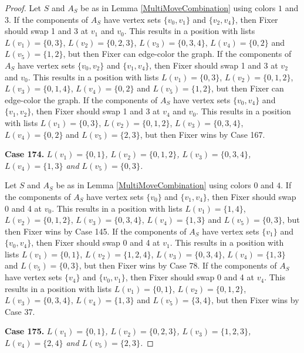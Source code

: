 \documentclass[12pt]{amsart}
\theoremstyle{plain}
\theoremstyle{definition}
\theoremstyle{remark}
\begin{document}
\begin{proof}
Let $S$ and $A_S$ be as in Lemma \ref{MultiMoveCombination} using colors $1$ and $3$. If the components of $A_S$ have vertex sets $\{v_0, v_1\}$ and $\{v_2, v_4\}$, then Fixer should swap 1 and 3 at $v_1$ and $v_0$. This results in a position with lists $L(v_1) = \{0, 3\}$, $L(v_2) = \{0, 2, 3\}$, $L(v_3) = \{0, 3, 4\}$, $L(v_4) = \{0, 2\}$ and $L(v_5) = \{1, 2\}$, but then Fixer can edge-color the graph.
If the components of $A_S$ have vertex sets $\{v_0, v_2\}$ and $\{v_1, v_4\}$, then Fixer should swap 1 and 3 at $v_2$ and $v_0$. This results in a position with lists $L(v_1) = \{0, 3\}$, $L(v_2) = \{0, 1, 2\}$, $L(v_3) = \{0, 1, 4\}$, $L(v_4) = \{0, 2\}$ and $L(v_5) = \{1, 2\}$, but then Fixer can edge-color the graph.
If the components of $A_S$ have vertex sets $\{v_0, v_4\}$ and $\{v_1, v_2\}$, then Fixer should swap 1 and 3 at $v_4$ and $v_0$. This results in a position with lists $L(v_1) = \{0, 3\}$, $L(v_2) = \{0, 1, 2\}$, $L(v_3) = \{0, 3, 4\}$, $L(v_4) = \{0, 2\}$ and $L(v_5) = \{2, 3\}$, but then Fixer wins by Case 167.

\noindent\textbf{Case 174.  }\textit{$L(v_1) = \{0, 1\}$, $L(v_2) = \{0, 1, 2\}$, $L(v_3) = \{0, 3, 4\}$, $L(v_4) = \{1, 3\}$ and $L(v_5) = \{0, 3\}$.}

Let $S$ and $A_S$ be as in Lemma \ref{MultiMoveCombination} using colors $0$ and $4$. If the components of $A_S$ have vertex sets $\{v_0\}$ and $\{v_1, v_4\}$, then Fixer should swap 0 and 4 at $v_0$. This results in a position with lists $L(v_1) = \{1, 4\}$, $L(v_2) = \{0, 1, 2\}$, $L(v_3) = \{0, 3, 4\}$, $L(v_4) = \{1, 3\}$ and $L(v_5) = \{0, 3\}$, but then Fixer wins by Case 145.
If the components of $A_S$ have vertex sets $\{v_1\}$ and $\{v_0, v_4\}$, then Fixer should swap 0 and 4 at $v_1$. This results in a position with lists $L(v_1) = \{0, 1\}$, $L(v_2) = \{1, 2, 4\}$, $L(v_3) = \{0, 3, 4\}$, $L(v_4) = \{1, 3\}$ and $L(v_5) = \{0, 3\}$, but then Fixer wins by Case 78.
If the components of $A_S$ have vertex sets $\{v_4\}$ and $\{v_0, v_1\}$, then Fixer should swap 0 and 4 at $v_4$. This results in a position with lists $L(v_1) = \{0, 1\}$, $L(v_2) = \{0, 1, 2\}$, $L(v_3) = \{0, 3, 4\}$, $L(v_4) = \{1, 3\}$ and $L(v_5) = \{3, 4\}$, but then Fixer wins by Case 37.

\noindent\textbf{Case 175.  }\textit{$L(v_1) = \{0, 1\}$, $L(v_2) = \{0, 2, 3\}$, $L(v_3) = \{1, 2, 3\}$, $L(v_4) = \{2, 4\}$ and $L(v_5) = \{2, 3\}$.}


\end{proof}
\end{document}
